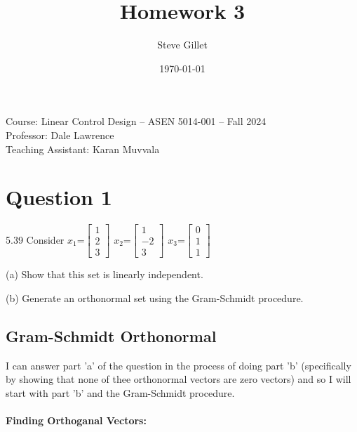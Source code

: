 \documentclass{article}
\title{Homework 3}
\author{Steve Gillet}
\date{\today}
\newcommand{\className}{Course: Linear Control Design – ASEN 5014-001 – Fall 2024}
\newcommand{\professorName}{Professor: Dale Lawrence}
\newcommand{\taName}{Teaching Assistant: Karan Muvvala}
\begin{document}
\maketitle
\begin{center}
    \large{\className} \\
    \large{\professorName} \\
    \large{\taName}
\end{center}

\section{Question 1}
5.39 Consider $x_1$=$\begin{bmatrix} 1 \\ 2 \\ 3 \end{bmatrix}$
$x_2$=$\begin{bmatrix} 1 \\ -2 \\ 3 \end{bmatrix}$
$x_3$=$\begin{bmatrix} 0 \\ 1 \\ 1 \end{bmatrix}$

(a) Show that this set is linearly independent.

(b) Generate an orthonormal set using the Gram-Schmidt procedure.

\subsection{Gram-Schmidt Orthonormal}

I can answer part 'a' of the question in the process of doing part 'b' (specifically by showing that none of thee orthonormal vectors are zero vectors) and so I will start with part 'b' and the Gram-Schmidt procedure.
\\
\\
\textbf{Finding Orthoganal Vectors:}
\end{document}
